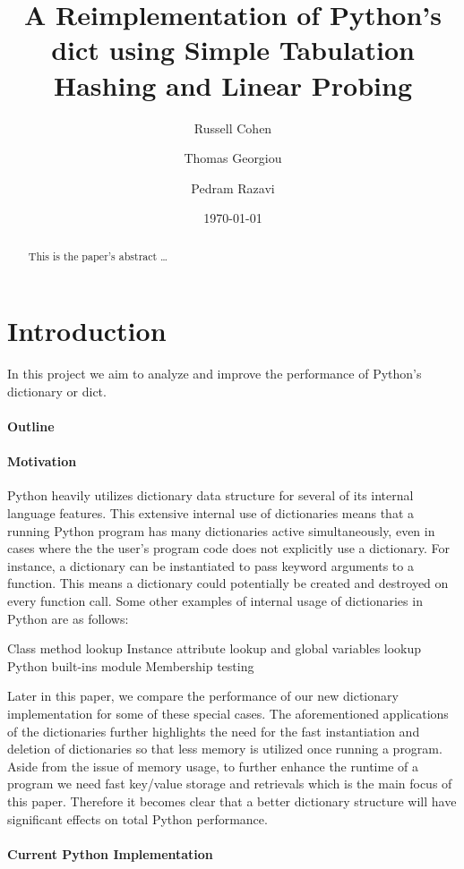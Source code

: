 \documentclass[11pt]{article}
\title{A Reimplementation of Python’s dict using Simple Tabulation Hashing and Linear Probing}
\author{
        Russell Cohen \\
            \and
        Thomas Georgiou \\
            \and
        Pedram Razavi
}
\date{\today}
\begin{document}
\maketitle

\begin{abstract}
This is the paper's abstract \ldots
\end{abstract}

\section{Introduction}
In this project we aim to analyze and improve the performance of Python’s dictionary or dict. 
\paragraph{Outline}


\paragraph{Motivation}
Python heavily utilizes dictionary data structure for several of its internal language features. This extensive internal use of dictionaries means that a running Python program has many dictionaries active simultaneously, even in cases where the the user’s program code does not explicitly use a dictionary. For instance, a dictionary can be instantiated to pass keyword arguments to a function. This means a dictionary could potentially be created and destroyed on every function call.  Some other examples of internal usage of dictionaries in Python are as follows:

Class method lookup
Instance attribute lookup and global variables lookup
Python built-ins module
Membership testing

Later in this paper, we compare the performance of our new dictionary implementation for some of these special cases. The aforementioned applications of the dictionaries further highlights the need for the fast instantiation and deletion of dictionaries so that less memory is utilized once running a program. Aside from the issue of memory usage, to further enhance the runtime of a program we need fast key/value storage and retrievals which is the main focus of this paper. Therefore it becomes clear that a better dictionary structure will have significant effects on total Python performance.

\paragraph{Current Python Implementation
}
\end{document}
